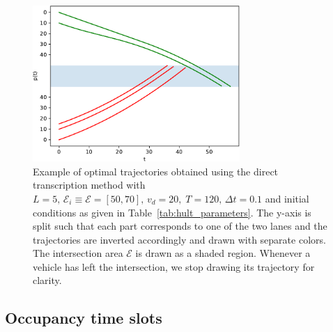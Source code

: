 \documentclass[a4paper]{article}
\theoremstyle{definition}
\theoremstyle{plain}
\begin{document}
\begin{figure}[t]
  \centering
  \includegraphics[width=0.7\textwidth]{figures/direct_transcription_example.pdf}
  \caption{Example of optimal trajectories obtained using the direct
    transcription method with
    $L = 5, \, \mathcal{E}_{i} \equiv \mathcal{E} = [50, 70], \, v_{d} = 20, \; T=120, \, \Delta t = 0.1$
    and initial conditions as given in Table~\ref{tab:hult_parameters}. The
    y-axis is split such that each part corresponds to one of the two lanes and
    the trajectories are inverted accordingly and drawn with separate colors.
    The intersection area $\mathcal{E}$ is drawn as a shaded region. Whenever a
    vehicle has left the intersection, we stop drawing its trajectory for
    clarity.}
  \label{fig:direct_transcription_example}
\end{figure}


\subsection*{Occupancy time slots}
\end{document}
